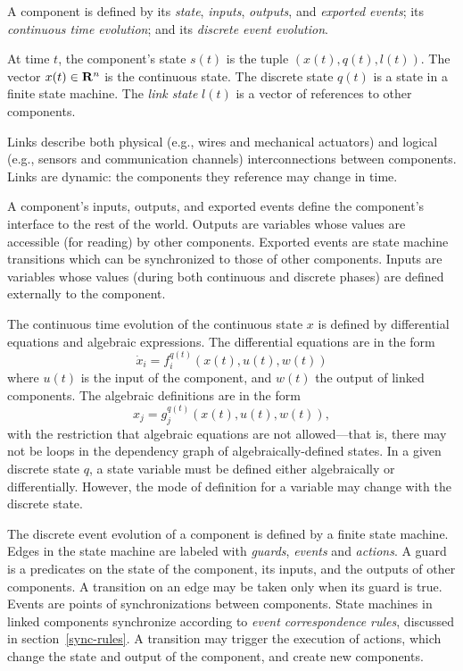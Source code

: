 A component is defined by its {\em state}, {\em inputs}, {\em
outputs}, and {\em exported events}; its {\em continuous time
evolution}; and its {\em discrete event evolution}.

At time $t$, the component's state $s(t)$ is the tuple $(x(t), q(t), l(t))$.
The vector $x(t) \in {\bf R}^n$ is the continuous state.  The discrete
state $q(t)$ is a state in a finite state machine.  The {\em link
state} $l(t)$ is a vector of references to other components.

Links describe both physical (e.g., wires and mechanical actuators)
and logical (e.g., sensors and communication channels)
interconnections between components.  Links are dynamic: the
components they reference may change in time.

A component's inputs, outputs, and exported events define the
component's interface to the rest of the world.  Outputs are variables
whose values are accessible (for reading) by other components.
Exported events are state machine transitions which can be
synchronized to those of other components.  Inputs are variables whose
values (during both continuous and discrete phases) are defined
externally to the component.

The continuous time evolution of the continuous state $x$ is defined
by differential equations and algebraic expressions.  The differential
equations are in the form \[ \dot{x}_i = f_i^{q(t)}(x(t), u(t), w(t))
\] where $u(t)$ is the input of the component, and $w(t)$ the output
of linked components.  The algebraic definitions are in the form \[
x_j = g_j^{q(t)}(x(t),u(t),w(t)), \] with the restriction that
algebraic equations are not allowed---that is, there may not be loops
in the dependency graph of algebraically-defined states.  In a given
discrete state $q$, a state variable must be defined either
algebraically or differentially.  However, the mode of definition for
a variable may change with the discrete state.

The discrete event evolution of a component is defined by a finite
state machine.  Edges in the state machine are labeled with {\em
guards}, {\em events} and {\em actions}.  A guard is a predicates on
the state of the component, its inputs, and the outputs of other
components.  A transition on an edge may be taken only when its guard
is true.  Events are points of synchronizations between components.
State machines in linked components synchronize according to {\em
event correspondence rules}, discussed in section~\ref{sync-rules}.  A
transition may trigger the execution of actions, which change the
state and output of the component, and create new components.

